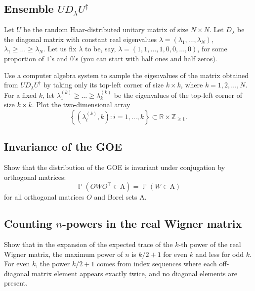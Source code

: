 \documentclass[letterpaper,11pt,oneside,reqno]{article}
\numberwithin{equation}{section}
\theoremstyle{definition}
\begin{document}
\subsection{Ensemble $UD_\lambda U^\dagger$}

Let $U$ be the random Haar-distributed unitary matrix of size $N\times N$.
Let $D_\lambda$ be the diagonal matrix with constant real eigenvalues
$\lambda=(\lambda_1,\ldots,\lambda_N)$,
$\lambda_1\ge \ldots\ge \lambda_N$.
Let us fix $\lambda$ to be, say, $\lambda=(1,1,\ldots,1,0,0,\ldots,0  )$,
for some proportion of $1$'s and $0$'s (you can start with half
ones and half zeros).

Use a computer algebra system to
sample the eigenvalues of the matrix
obtained from $UD_\lambda U^\dagger$
by taking only its top-left corner of size $k\times k$,
where $k=1,2,\ldots,N $.
For a fixed $k$, let
$\lambda_1^{(k)}\ge \ldots\ge \lambda_k^{(k)}$
be the eigenvalues of the top-left corner of size $k\times k$.
Plot the two-dimensional array
\begin{equation*}
	\left\{ (\lambda_i^{(k)},k)\colon i=1,\ldots,k  \right\}\subset \mathbb{R}\times
	\mathbb{Z}_{\ge1}.
\end{equation*}

\subsection{Invariance of the GOE}

Show that the distribution of the GOE is invariant under
conjugation by orthogonal matrices:
\begin{equation*}
	\operatorname{\mathbb{P}}(O W O^\top \in \mathrm{A}) = \operatorname{\mathbb{P}}(W \in \mathrm{A})
\end{equation*}
for all orthogonal matrices $O$ and Borel sets $\mathrm{A}$.

\subsection{Counting $n$-powers in the real Wigner matrix}
\label{prob:counting-n-powers}

Show that in the expansion of the expected trace of the
$k$-th power of the real Wigner matrix, the maximum power of
$n$ is $k/2+1$ for even $k$ and less for odd $k$. For even
$k$, the power $k/2+1$ comes from index sequences where each
off-diagonal matrix element appears exactly twice, and no
diagonal elements are present.
\end{document}
